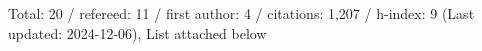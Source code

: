 Total: 20 / refereed: 11 / first author: 4 / citations: 1,207 / h-index: 9 (Last updated: 2024-12-06), List attached below